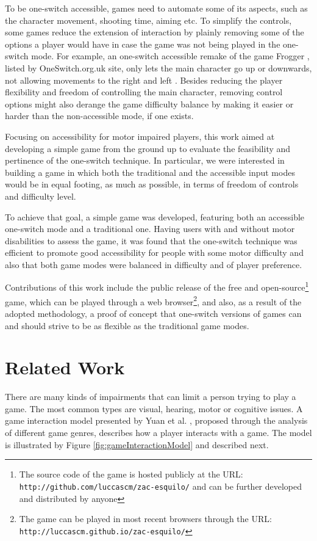 \documentclass[a4paper]{sbgames}               %
\begin{document}
To be one-switch accessible, games need to automate some of its aspects, such as the character movement, shooting time, aiming etc. To simplify the controls, some games reduce the extension of interaction by plainly removing some of the options a player would have in case the game was not being played in the one-switch mode. For example, an one-switch accessible remake of the game Frogger , listed by OneSwitch.org.uk site, only lets the main character go up or downwards, not allowing movements to the right and left \cite{froggeracessivel}. Besides reducing the player flexibility and freedom of controlling the main character, removing control options might also derange the game difficulty balance by making it easier or harder than the non-accessible mode, if one exists.

Focusing on accessibility for motor impaired players, this work aimed at developing a simple game from the ground up to evaluate the feasibility and pertinence of the one-switch technique. In particular, we were interested in building a game in which both the traditional and the accessible input modes would be in equal footing, as much as possible, in terms of freedom of controls and difficulty level.

To achieve that goal, a simple game was developed, featuring both an accessible one-switch mode and a traditional one. Having users with and without motor disabilities to assess the game, it was found that the one-switch technique was efficient to promote good accessibility for people with some motor difficulty and also that both game modes were balanced in difficulty and of player preference. 

Contributions of this work include the public release of the free and open-source\footnote{The source code of the game is hosted publicly at the URL: \nolinkurl{http://github.com/luccascm/zac-esquilo/} and can be further developed and distributed by anyone} game, which can be played through a web browser\footnote{The game can be played in most recent browsers through the URL: \nolinkurl{http://luccascm.github.io/zac-esquilo/}}, and also, as a result of the adopted methodology, a proof of concept that one-switch versions of games can and should strive to be as flexible as the traditional game modes.

\section{Related Work}
\label{sec:related-work}
There are many kinds of impairments that can limit a person trying to play a game. The most common types are visual, hearing, motor or cognitive issues. A game interaction model presented by Yuan et al. , proposed through the  analysis of different game genres, describes how a player interacts with a game. The model is illustrated by Figure \ref{fig:gameInteractionModel} and described next.
\end{document}
